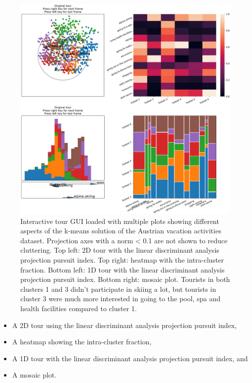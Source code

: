 \documentclass[article]{ajs}
\begin{document}
\begin{figure}[h!]
    \centering
    \includegraphics[width=1\textwidth]{winter_cl7_init.pdf}
    \caption{Interactive tour GUI loaded with multiple plots showing different aspects of the k-means solution of the Austrian vacation activities dataset. Projection axes with a norm < 0.1 are not shown to reduce cluttering. Top left: 2D tour with the linear discriminant analysis projection pursuit index. Top right: heatmap with the intra-cluster fraction. Bottom left: 1D tour with the linear discriminant analysis projection pursuit index. Bottom right: mosaic plot. Tourists in both clusters 1 and 3 didn't participate in skiing a lot, but tourists in cluster 3 were much more interested in going to the pool, spa and health facilities compared to cluster 1.}
    \label{fig:winter_cl7_init}
\end{figure}

\begin{itemize}
    \item A 2D tour using the linear discriminant analysis projection pursuit index,
    \item A heatmap showing the intra-cluster fraction,
    \item A 1D tour with the linear discriminant analysis projection pursuit index, and
    \item A mosaic plot.
\end{itemize}
\end{document}
